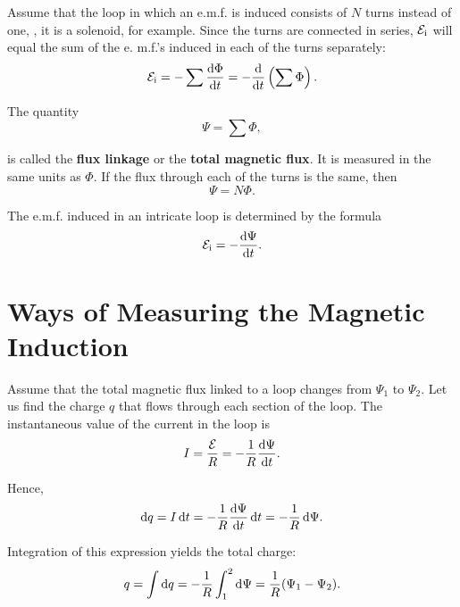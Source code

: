 Assume that the loop in which an e.m.f. is induced consists of $N$ turns instead of one, \ie, it is a solenoid, for example.
Since the turns are connected in series, $\mathcal{E}_{\text{i}}$ will equal the sum of the e. m.f.'s induced in each of the turns separately:
\begin{equation*}
    \mathcal{E}_{\text{i}} = - \sum \dfrac{\mathrm{d}\Phi}{\mathrm{d} t} = - \dfrac{\mathrm{d}}{\mathrm{d} t}\left(\sum \Phi\right).
\end{equation*}

The quantity
\begin{equation}\label{eq:8_7}
    \Psi = \sum \Phi,
\end{equation}

\noindent
is called the \textbf{flux linkage} or the \textbf{total magnetic flux}. It is measured in the same units as $\Phi$.
If the flux through each of the turns is the same, then
\begin{equation}\label{eq:8_8}
    \Psi = N \Phi.
\end{equation}

\noindent
The e.m.f. induced in an intricate loop is determined by the formula
\begin{equation}\label{eq:8_9}
    \mathcal{E}_{\text{i}} = - \dfrac{\mathrm{d}\Psi}{\mathrm{d} t}.
\end{equation}

\section{Ways of Measuring the Magnetic Induction}\label{sec:8_3}

Assume that the total magnetic flux linked to a loop changes from $\Psi_1$ to $\Psi_2$.
Let us find the charge $q$ that flows through each section of the loop.
The instantaneous value of the current in the loop is
\begin{equation*}
	I = \frac{\mathcal{E}}{R} = - \frac{1}{R} \dfrac{\mathrm{d}\Psi}{\mathrm{d} t}.
\end{equation*}

\noindent
Hence,
\begin{equation*}
	\mathrm{d} q = I\, \mathrm{d} t = - \frac{1}{R} \dfrac{\mathrm{d}\Psi}{\mathrm{d} t}\, \mathrm{d} t = - \frac{1}{R}\, \mathrm{d}\Psi.
\end{equation*}

\noindent
Integration of this expression yields the total charge:
\begin{equation}\label{eq:8_10}
	q = \int \mathrm{d} q = - \frac{1}{R} \int_1^2 \mathrm{d}\Psi = \frac{1}{R} (\Psi_1 - \Psi_2).
\end{equation}

